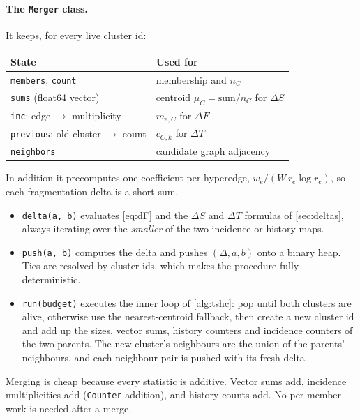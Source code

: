 \documentclass[11pt,a4paper]{article}
\newcommand{\cref}[1]{\autoref{#1}}
\theoremstyle{remark}
\newcommand{\code}[1]{\texttt{\small #1}}
\begin{document}
\paragraph{The \code{Merger} class.}
It keeps, for every live cluster id:
\begin{center}
\begin{tabular}{ll}
\toprule
State & Used for\\
\midrule
\code{members}, \code{count} & membership and $n_C$\\
\code{sums} (float64 vector) & centroid $\mu_C=\text{sum}/n_C$ for $\Delta S$\\
\code{inc}: edge $\to$ multiplicity & $m_{e,C}$ for $\Delta F$\\
\code{previous}: old cluster $\to$ count & $c_{C,k}$ for $\Delta T$\\
\code{neighbors} & candidate graph adjacency\\
\bottomrule
\end{tabular}
\end{center}
In addition it precomputes one coefficient per hyperedge,
$w_e/(W\,r_e\log r_e)$, so each fragmentation delta is a short sum.

\begin{itemize}
  \item \code{delta(a, b)} evaluates \cref{eq:dF} and the $\Delta S$ and $\Delta T$
        formulas of \cref{sec:deltas}, always iterating over the \emph{smaller} of the two
        incidence or history maps.
  \item \code{push(a, b)} computes the delta and pushes $(\Delta,a,b)$ onto a binary heap.
        Ties are resolved by cluster ids, which makes the procedure fully deterministic.
  \item \code{run(budget)} executes the inner loop of \cref{alg:tshc}: pop until both
        clusters are alive, otherwise use the nearest-centroid fallback, then create a new
        cluster id and add up the sizes, vector sums, history counters and incidence
        counters of the two parents. The new cluster's neighbours are the union of the
        parents' neighbours, and each neighbour pair is pushed with its fresh delta.
\end{itemize}

Merging is cheap because every statistic is additive. Vector sums add, incidence
multiplicities add (\code{Counter} addition), and history counts add. No per-member work
is needed after a merge.
\end{document}
